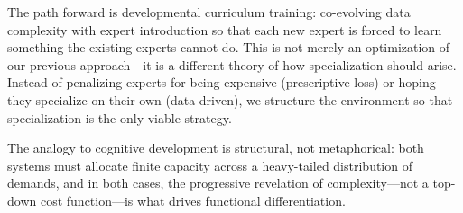 \documentclass{article}
\begin{document}
The path forward is developmental curriculum training: co-evolving data complexity with expert introduction so that each new expert is forced to learn something the existing experts cannot do. This is not merely an optimization of our previous approach---it is a different theory of how specialization should arise. Instead of penalizing experts for being expensive (prescriptive loss) or hoping they specialize on their own (data-driven), we structure the environment so that specialization is the only viable strategy.

The analogy to cognitive development is structural, not metaphorical: both systems must allocate finite capacity across a heavy-tailed distribution of demands, and in both cases, the progressive revelation of complexity---not a top-down cost function---is what drives functional differentiation.


\end{document}
